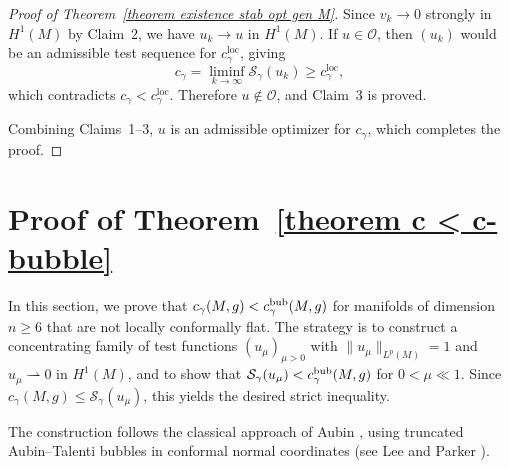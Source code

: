 \documentclass[reqno,11pt]{amsart}
\numberwithin{equation}{section}
\theoremstyle{definition}
\theoremstyle{remark}
\newcommand{\loc}{\mathrm{loc}}
\begin{document}
\begin{proof}[Proof of Theorem~\ref{theorem existence stab opt gen M}]
\smallskip
{} Since $v_k \to 0$ strongly in $H^1(M)$ by Claim~2, we have $u_k \to u$ in $H^1(M)$. If $u \in \mathscr{O}$, then $(u_k)$ would be an admissible test sequence for $c_\gamma^{\loc}$, giving
\[
c_\gamma = \liminf_{k \to \infty} \mathcal{S}_\gamma(u_k) \geqslant c_\gamma^{\loc},
\]
which contradicts $c_\gamma < c_\gamma^{\loc}$. Therefore $u \notin \mathscr{O}$, and Claim~3 is proved.

\medskip
Combining Claims~1--3, $u$ is an admissible optimizer for $c_\gamma$, which completes the proof.
\end{proof}


\section{Proof of Theorem~\ref{theorem c < c-bubble}}\label{sec:proof-thm2}

In this section, we prove that $c_{\gamma}(M,g) < c_{\gamma}^{\rm bub}(M,g)$ for manifolds of 
dimension $n \geqslant 6$ that are not locally conformally flat. The strategy is to construct a 
concentrating family of test functions $(u_\mu)_{\mu > 0}$ with $\|u_\mu\|_{L^p(M)} = 1$ and 
$u_\mu \rightharpoonup 0$ in $H^1(M)$, and to show that $\mathcal{S}_\gamma(u_\mu) < 
c_{\gamma}^{\rm bub}(M,g)$ for $0 < \mu \ll 1$. Since $c_{\gamma}(M,g) \leqslant 
\mathcal{S}_\gamma(u_\mu)$, this yields the desired strict inequality.

The construction follows the classical approach of Aubin \cite{Aub}, using truncated Aubin--Talenti 
bubbles in conformal normal coordinates (see Lee and Parker \cite{LP}).
\end{document}
